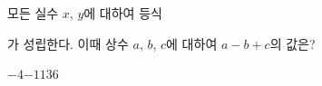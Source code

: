 모든 실수 $x$, $y$에 대하여 등식\par\smallskip{}\par\smallskip\noindent 가 성립한다. 이때 상수 $a$, $b$, $c$에 대하여 $a-b+c$의 값은?
\begin{choices32}{$-4$}{$-1$}{$1$}{$3$}{$6$}\end{choices32}
